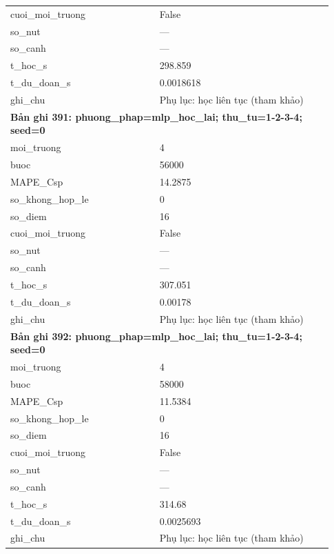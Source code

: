 \begin{longtable}{p{0.43\linewidth}p{0.50\linewidth}}
cuoi\_\allowbreak moi\_\allowbreak truong & False \\
so\_\allowbreak nut & — \\
so\_\allowbreak canh & — \\
t\_\allowbreak hoc\_\allowbreak s & 298.859 \\
t\_\allowbreak du\_\allowbreak doan\_\allowbreak s & 0.0018618 \\
ghi\_\allowbreak chu & Phụ lục: học liên tục (tham khảo) \\
\midrule
\multicolumn{2}{p{0.95\linewidth}}{\textbf{Bản ghi 391: phuong\_phap=mlp\_hoc\_lai; thu\_tu=1-2-3-4; seed=0}} \\
moi\_\allowbreak truong & 4 \\
buoc & 56000 \\
MAPE\_\allowbreak Csp & 14.2875 \\
so\_\allowbreak khong\_\allowbreak hop\_\allowbreak le & 0 \\
so\_\allowbreak diem & 16 \\
cuoi\_\allowbreak moi\_\allowbreak truong & False \\
so\_\allowbreak nut & — \\
so\_\allowbreak canh & — \\
t\_\allowbreak hoc\_\allowbreak s & 307.051 \\
t\_\allowbreak du\_\allowbreak doan\_\allowbreak s & 0.00178 \\
ghi\_\allowbreak chu & Phụ lục: học liên tục (tham khảo) \\
\midrule
\multicolumn{2}{p{0.95\linewidth}}{\textbf{Bản ghi 392: phuong\_phap=mlp\_hoc\_lai; thu\_tu=1-2-3-4; seed=0}} \\
moi\_\allowbreak truong & 4 \\
buoc & 58000 \\
MAPE\_\allowbreak Csp & 11.5384 \\
so\_\allowbreak khong\_\allowbreak hop\_\allowbreak le & 0 \\
so\_\allowbreak diem & 16 \\
cuoi\_\allowbreak moi\_\allowbreak truong & False \\
so\_\allowbreak nut & — \\
so\_\allowbreak canh & — \\
t\_\allowbreak hoc\_\allowbreak s & 314.68 \\
t\_\allowbreak du\_\allowbreak doan\_\allowbreak s & 0.0025693 \\
ghi\_\allowbreak chu & Phụ lục: học liên tục (tham khảo) \\

\end{longtable}
